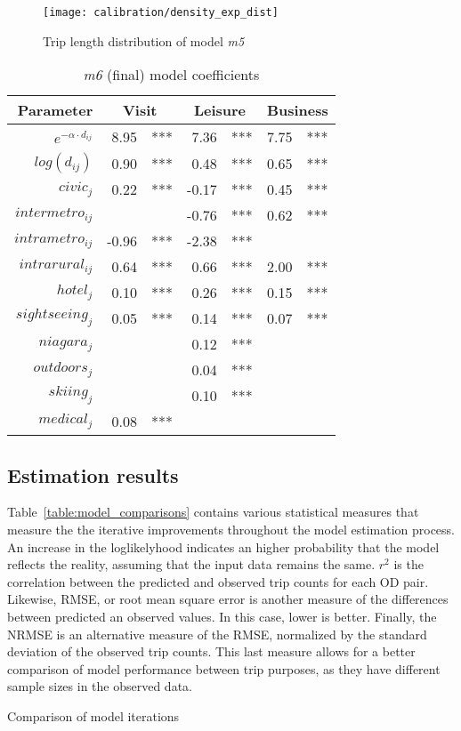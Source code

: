 \begin{figure}[H]
\centering
\texttt{[image: calibration/density\_exp\_dist]}
\caption{Trip length distribution of model \textit{m5}}
\label{fig:trip_length_m5}
\end{figure}

\begin{table}[H]
\centering
\caption{\textit{m6} (final) model coefficients}
\label{table:m6-coeff}
\begin{tabular}{@{}rrlrlrl@{}}
  \toprule
 Parameter & \multicolumn{2}{c}{Visit} & \multicolumn{2}{c}{Leisure} & \multicolumn{2}{c}{Business} \\ \midrule
  $e^{-\alpha \cdot d_{ij}}$& 8.95 & *** & 7.36 & *** & 7.75 & *** \\  
  $log(d_{ij})$ & 0.90 & *** & 0.48 & *** & 0.65 & *** \\  
  $civic_j  $ & 0.22 & *** & -0.17 & *** & 0.45 & *** \\ 
  $intermetro_{ij}$ &  &  & -0.76 & *** & 0.62 & *** \\  
  $intrametro_{ij}$ & -0.96 & *** & -2.38 & *** &  &  \\   
  $intrarural_{ij}$ & 0.64 & *** & 0.66 & *** & 2.00 & ***  \\
  $hotel_j$  & 0.10 & *** & 0.26 & *** & 0.15 & *** \\ 
  $sightseeing_j$  & 0.05 & *** & 0.14 & *** & 0.07 & *** \\   
  $niagara_j$  &  &  & 0.12 & *** &  &  \\  
  $outdoors_j$  &  &  & 0.04 & *** &  &  \\ 
  $skiing_j$ &  &  & 0.10 & *** &  &  \\ 
  $medical_j$  & 0.08 & *** &  &  &  &  \\  
   \bottomrule
\end{tabular}
\end{table}

\subsection{Estimation results}
Table~\ref{table:model_comparisons} contains various statistical measures that measure the the iterative improvements throughout the model estimation process. An increase in the loglikelyhood indicates an higher probability that the model reflects the reality, assuming that the input data remains the same. $r^2$ is the correlation between the predicted and observed trip counts for each OD pair. Likewise, RMSE, or root mean square error is another measure of the differences between predicted an observed values. In this case, lower is better. Finally, the NRMSE is an alternative measure of the RMSE, normalized by the standard deviation of the observed trip counts. This last measure allows for a better comparison of model performance between trip purposes, as they have different sample sizes in the observed data. 

\begin{table}[H]
\centering
\caption{Comparison of model iterations}
\label{table:model_comparisons}
\begin{adjustbox}{center}


\end{adjustbox}

\end{table}


